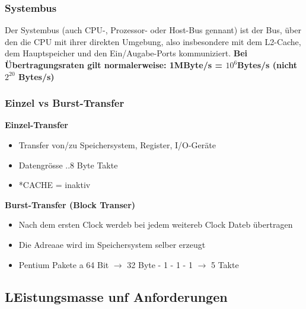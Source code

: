 \subsubsection{Systembus}
Der Systembus (auch CPU-, Prozessor- oder Host-Bus gennant) ist der Bus, über den die CPU mit ihrer direkten Umgebung, also insbesondere mit dem L2-Cache, dem Hauptspeicher und den Ein/Augabe-Ports kommuniziert.\newline
\textbf{Bei Übertragungsraten gilt normalerweise: 1MByte/s = $ 10^6 $Bytes/s (nicht $ 2^{20}$ Bytes/s)}\newline

\subsubsection{Einzel vs Burst-Transfer}
\begin{multicols}{2}
    \begin{minipage}{\linewidth}
        \textbf{Einzel-Transfer}
        \begin{itemize}
            \item Transfer von/zu Speichersystem, Register, I/O-Geräte
            \item Datengrösse
            ..8 Byte
             Takte
            \item  *CACHE = inaktiv
        \end{itemize}
    \end{minipage}

    \begin{minipage}{\linewidth}
    \textbf{Burst-Transfer (Block Transer)}
    \begin{itemize}
        \item Nach dem ersten Clock werdeb bei jedem weitereb Clock Dateb übertragen
        \item Die Adreaae wird im Speichersystem selber erzeugt
        \item Pentium
         Pakete a 64 Bit $ \rightarrow $ 32 Byte
         - 1 - 1 - 1 $ \rightarrow $ 5 Takte
    \end{itemize}
    \end{minipage}
\end{multicols}

\subsection{LEistungsmasse unf Anforderungen}
